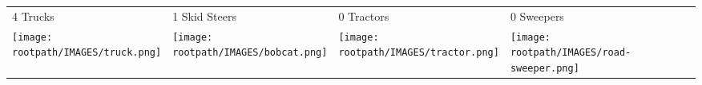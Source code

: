 \begin{tabular}{m{}m{}m{}m{}}
    {\color{ccorange} 4 Trucks} & {\color{ccorange} 1 Skid Steers} & {\color{ccorange} 0 Tractors} & {\color{ccorange} 0 Sweepers} \\
    \texttt{[image: \\rootpath/IMAGES/truck.png]}  & \texttt{[image: \\rootpath/IMAGES/bobcat.png]} & \texttt{[image: \\rootpath/IMAGES/tractor.png]} & \texttt{[image: \\rootpath/IMAGES/road-sweeper.png]}                         
    \end{tabular}